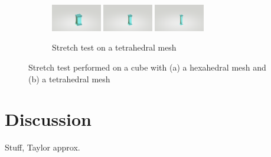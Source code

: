 \begin{figure}[!htbp]
\begin{subfigure}[b]{\textwidth}
        \hfill
        \includegraphics[width=0.24\textwidth]{resources/tetcli_step8.png}
        \hfill
        \includegraphics[width=0.24\textwidth]{resources/tetcli_step16.png}
        \hfill
        \includegraphics[width=0.24\textwidth]{resources/tetcli_step24.png}
        \caption{Stretch test on a tetrahedral mesh}
    \end{subfigure}
    \caption{Stretch test performed on a cube with (a) a hexahedral mesh and (b) a tetrahedral mesh}
    \label{fig:stretchtest}
\end{figure}





\section{Discussion}
Stuff, Taylor approx.


